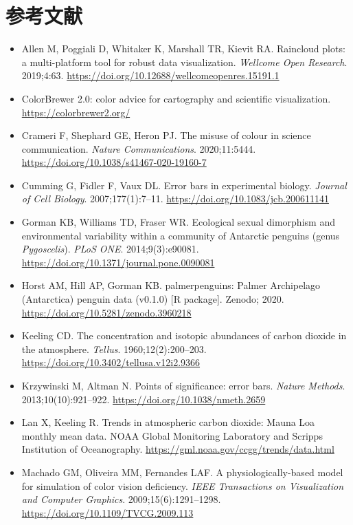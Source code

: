 \section*{参考文献}

\begin{itemize}
\item Allen M, Poggiali D, Whitaker K, Marshall TR, Kievit RA. Raincloud plots: a multi-platform tool for robust data visualization. \emph{Wellcome Open Research}. 2019;4:63. \url{https://doi.org/10.12688/wellcomeopenres.15191.1}
\item ColorBrewer 2.0: color advice for cartography and scientific visualization. \url{https://colorbrewer2.org/}
\item Crameri F, Shephard GE, Heron PJ. The misuse of colour in science communication. \emph{Nature Communications}. 2020;11:5444. \url{https://doi.org/10.1038/s41467-020-19160-7}
\item Cumming G, Fidler F, Vaux DL. Error bars in experimental biology. \emph{Journal of Cell Biology}. 2007;177(1):7--11. \url{https://doi.org/10.1083/jcb.200611141}
\item Gorman KB, Williams TD, Fraser WR. Ecological sexual dimorphism and environmental variability within a community of Antarctic penguins (genus \emph{Pygoscelis}). \emph{PLoS ONE}. 2014;9(3):e90081. \url{https://doi.org/10.1371/journal.pone.0090081}
\item Horst AM, Hill AP, Gorman KB. palmerpenguins: Palmer Archipelago (Antarctica) penguin data (v0.1.0) [R package]. Zenodo; 2020. \url{https://doi.org/10.5281/zenodo.3960218}
\item Keeling CD. The concentration and isotopic abundances of carbon dioxide in the atmosphere. \emph{Tellus}. 1960;12(2):200--203. \url{https://doi.org/10.3402/tellusa.v12i2.9366}
\item Krzywinski M, Altman N. Points of significance: error bars. \emph{Nature Methods}. 2013;10(10):921--922. \url{https://doi.org/10.1038/nmeth.2659}
\item Lan X, Keeling R. Trends in atmospheric carbon dioxide: Mauna Loa monthly mean data. NOAA Global Monitoring Laboratory and Scripps Institution of Oceanography. \url{https://gml.noaa.gov/ccgg/trends/data.html}
\item Machado GM, Oliveira MM, Fernandes LAF. A physiologically-based model for simulation of color vision deficiency. \emph{IEEE Transactions on Visualization and Computer Graphics}. 2009;15(6):1291--1298. \url{https://doi.org/10.1109/TVCG.2009.113}

\end{itemize}
